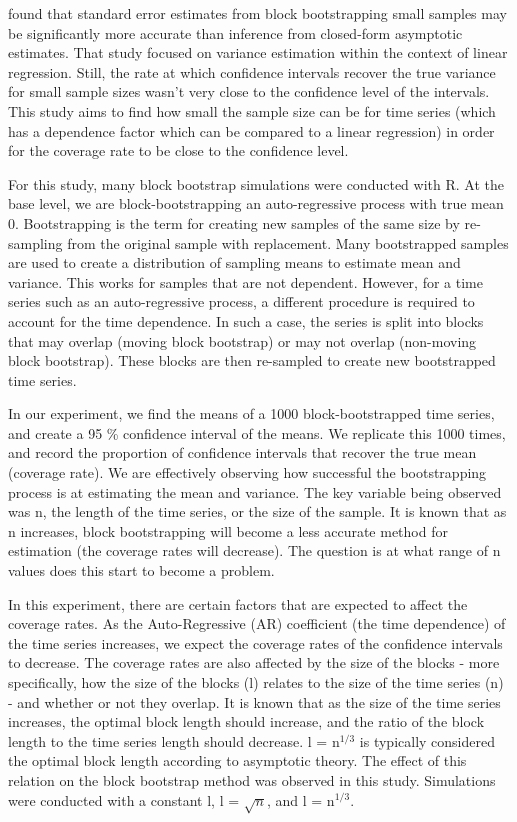 \documentclass[12pt, letterpaper, titlepage]{article}
\begin{document}
\citet{goncalves2005bootstrap} found that standard error estimates from block bootstrapping small 
samples 
may be significantly more accurate than inference from closed-form asymptotic estimates. That study focused on variance estimation within the context of linear regression. Still, the rate at which confidence intervals recover the true variance for small sample sizes wasn't very close to the confidence level of the intervals. This study aims to find how small the sample size can be for time series (which has a dependence factor which can be compared to a linear regression) in order for the coverage rate to be close to the confidence level.

For this study, many block bootstrap simulations were conducted with R. At the base
level, we are block-bootstrapping an auto-regressive process with true mean 0.
Bootstrapping is the term for creating new samples of the same size by re-sampling from
the original sample with replacement. Many bootstrapped samples are used to create a
distribution of sampling means to estimate mean and variance. This works for samples
that are not dependent. However, for a time series such as an auto-regressive process,
a different procedure is required to account for the time dependence. In such a case,
the series is split into blocks that may overlap (moving block bootstrap) or may not
overlap (non-moving block bootstrap). These blocks are then re-sampled to create new
bootstrapped time series. 

In our experiment, we find the means of a 1000 block-bootstrapped time series, 
and create a 95 \% confidence interval of the means. We replicate this 1000 times, 
and record the proportion of confidence intervals that recover the true mean 
(coverage rate). We are effectively observing how successful the bootstrapping process
is at estimating the mean and variance. The key variable being observed was n, 
the length of the time series, or the size of the sample. It is known that as n
increases, block bootstrapping will become a less accurate method for estimation
(the coverage rates will decrease). The question is at what range of n values does this
start to become a problem. 

In this experiment, there are certain factors that are expected to affect the coverage
rates. As the Auto-Regressive (AR) coefficient (the time dependence) of the time series 
increases,
we expect the coverage rates of the confidence intervals to decrease.
The coverage rates are also affected by the size of the blocks - more specifically,
how the size of the blocks (l) relates to the size of the time series (n) - 
and whether or not they overlap. It is known that as the size of the time series 
increases, the optimal block length should increase, and the ratio of the block length to 
the time series length should decrease. l = n$^{1/3}$ is typically considered the optimal 
block length according to asymptotic theory. \citep{buhlmann1999block} The effect of this relation on the block bootstrap method was observed in this study. Simulations were conducted with a constant l, l = $\sqrt{n}$, and l = n$^{1/3}$. 
\end{document}
